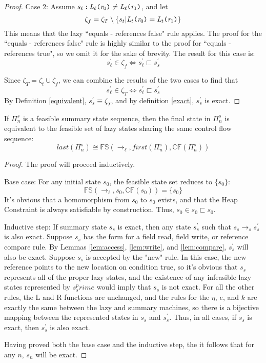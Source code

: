\begin{proof}
Case 2: Assume $s_\ell : \emph{L}_\ell \texttt{(} \emph{r}_0\texttt{)} \neq \emph{L}_\ell \texttt{(} \emph{r}_1 \texttt{)}$, and let 
$$\zeta_f = \zeta_T \setminus \{ s_t | \emph{L}_t \texttt{(} \emph{r}_0\texttt{)} = \emph{L}_t \texttt{(} \emph{r}_1 \texttt{)} \}$$ 
This means that the lazy ``equals - references false" rule applies. The proof for the ``equals - references false" rule is highly similar to the proof for ``equals - references true", so we omit it for the sake of brevity. The result for this case is:
$$s_\ell^\prime \in \zeta_f \Leftrightarrow s_\ell^\prime \sqsubset s_s^\prime$$

Since $\zeta_T = \zeta_t \cup \zeta_f$, we can combine the results of the two cases to find that 
$$s_\ell^\prime \in \zeta_T \Leftrightarrow s_\ell^\prime \sqsubset s_s^\prime$$
 By Definition \ref{equivalent}, $s_s^\prime \equiv \zeta_T$, and by definition \ref{exact}, $s_s^\prime$ is exact.
\end{proof}

\begin{theorem}
If $\Pi_n^s$ is a feasible summary state sequence, then the final state in $\Pi_n^s$ is equivalent to the feasible set of lazy states sharing the same control flow sequence:
\begin{equation}
\mathit{last}(\Pi_n^s) \cong \mathbb{FS}(\rightarrow_\ell, \mathit{first}(\Pi_n^s), \mathbb{CF}(\Pi_n^s) )
\end{equation}
\end{theorem}
\begin{proof}
The proof will proceed inductively.

Base case: For any initial state $s_0$, the feasible state set reduces to $\{s_0\}$:
$$\mathbb{FS}(\rightarrow_\ell, s_0, \mathbb{CF}(s_0)) = \{s_0\}$$
It's obvious that a homomorphism from $s_0$ to $s_0$ exists, and that the Heap Constraint is always satisfiable by construction. Thus, $s_0 \in  s_0 \sqsubset s_0$. 


Inductive step: If summary state $s_s$ is exact, then any state $s_s^\prime$ such that $s_s \rightarrow_s s_s^\prime$ is also exact. Suppose $s_s $ has the form for a field read, field write, or reference compare rule. By Lemmas \ref{lem:access}, \ref{lem:write}, and \ref{lem:compare}, $s_s^\prime$ will also be exact.
Suppose $s_s$ is accepted by the "new" rule. In this case, the new reference points to the new location on condition true, so it's obvious that $s_s$ represents all of the proper lazy states, and the existence of any infeasible lazy states represented by $s_s^prime$ would imply that $s_s$ is not exact.
For all the other rules, the L and R functions are unchanged, and the rules for the $\eta$, $e$, and $k$ are exactly the same between the lazy and summary machines, so there is a bijective mapping between the represented states in $s_s$ and $s_s^\prime$. 
Thus, in all cases, if $s_s$ is exact, then $s_s^\prime$ is also exact.

Having proved both the base case and the inductive step, the it follows that for any $n$, $s_n$ will be exact. 

\end{proof}
